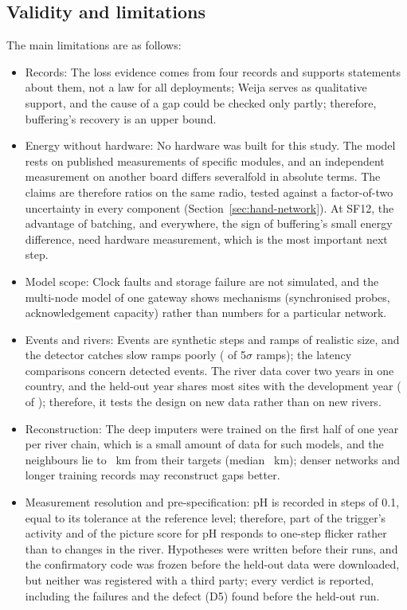 \subsection{Validity and limitations}
\label{sec:disc-limits}
The main limitations are as follows:
\begin{itemize}
\item Records: The loss evidence comes from four records and supports statements about them, not a law for all deployments; Weija serves as qualitative support, and the cause of a gap could be checked only partly; therefore, buffering's recovery is an upper bound.
\item Energy without hardware: No hardware was built for this study. The model rests on published measurements of specific modules, and an independent measurement on another board differs severalfold in absolute terms. The claims are therefore ratios on the same radio, tested against a factor-of-two uncertainty in every component (Section~\ref{sec:hand-network}). At SF12, the advantage of batching, and everywhere, the sign of buffering's small energy difference, need hardware measurement, which is the most important next step.
\item Model scope: Clock faults and storage failure are not simulated, and the multi-node model of one gateway shows mechanisms (synchronised probes, acknowledgement capacity) rather than numbers for a particular network.
\item Events and rivers: Events are synthetic steps and ramps of realistic size, and the detector catches slow ramps poorly (\detectRampFive{} of 5$\sigma$ ramps); the latency comparisons concern detected events. The river data cover two years in one country, and the held-out year shares most sites with the development year (\sitesBothYears{} of \confSites); therefore, it tests the design on new data rather than on new rivers.
\item Reconstruction: The deep imputers were trained on the first half of one year per river chain, which is a small amount of data for such models, and the neighbours lie \pairKmMin{} to \pairKmMax~km from their targets (median \pairKmMed~km); denser networks and longer training records may reconstruct gaps better.
\item Measurement resolution and pre-specification: pH is recorded in steps of 0.1, equal to its tolerance at the reference level; therefore, part of the trigger's activity and of the picture score for pH responds to one-step flicker rather than to changes in the river. Hypotheses were written before their runs, and the confirmatory code was frozen before the held-out data were downloaded, but neither was registered with a third party; every verdict is reported, including the failures and the defect (D5) found before the held-out run.
\end{itemize}

